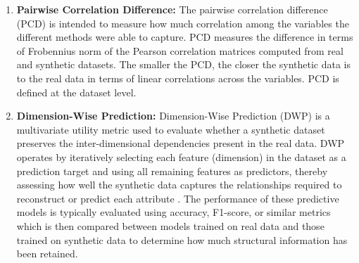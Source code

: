 \documentclass[master,proposal,extern,palatino]{rgseThesis}
\begin{document}
\begin{enumerate}
    \item \textbf{Pairwise Correlation Difference:} The pairwise correlation difference (PCD) is intended to measure how much correlation among the variables the different methods were able to capture\cite{goncalves2020generation}. PCD measures the difference in terms of Frobennius norm of the Pearson correlation matrices computed from real and synthetic datasets. The smaller the PCD, the closer the synthetic data is to the real data in terms of linear correlations across the variables. PCD is defined at the dataset level.
    \item \textbf{Dimension-Wise Prediction:} Dimension-Wise Prediction (DWP) is a multivariate utility metric used to evaluate whether a synthetic dataset preserves the inter-dimensional dependencies present in the real data. DWP operates by iteratively selecting each feature (dimension) in the dataset as a prediction target and using all remaining features as predictors, thereby assessing how well the synthetic data captures the relationships required to reconstruct or predict each attribute \cite{emam2021optimizing}. The performance of these predictive models is typically evaluated using accuracy, F1-score, or similar metrics which is then compared between models trained on real data and those trained on synthetic data to determine how much structural information has been retained.
\end{enumerate}
\end{document}
